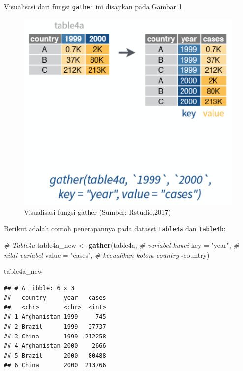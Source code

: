 \documentclass[]{book}
\newenvironment{Shaded}{\begin{snugshade}}{\end{snugshade}}
\newcommand{\KeywordTok}[1]{\textcolor[rgb]{0.13,0.29,0.53}{\textbf{#1}}}
\newcommand{\DataTypeTok}[1]{\textcolor[rgb]{0.13,0.29,0.53}{#1}}
\newcommand{\StringTok}[1]{\textcolor[rgb]{0.31,0.60,0.02}{#1}}
\newcommand{\CommentTok}[1]{\textcolor[rgb]{0.56,0.35,0.01}{\textit{#1}}}
\newcommand{\OperatorTok}[1]{\textcolor[rgb]{0.81,0.36,0.00}{\textbf{#1}}}
\newcommand{\NormalTok}[1]{#1}
\begin{document}
Visualisasi dari fungsi \texttt{gather} ini disajikan pada Gambar
\ref{fig:gather}

\begin{figure}

{\centering \includegraphics[width=5.56in]{gather} 

}

\caption{Visualisasi fungsi gather (Sumber: Rstudio,2017)}\label{fig:gather}
\end{figure}

Berikut adalah contoh penerapannya pada dataset \texttt{table4a} dan
\texttt{table4b}:

\begin{Shaded}
\begin{Highlighting}[]
\CommentTok{# Table4a}
\NormalTok{table4a_new <-}\StringTok{ }\KeywordTok{gather}\NormalTok{(table4a, }
                    \CommentTok{# variabel kunci}
                    \DataTypeTok{key =} \StringTok{"year"}\NormalTok{,}
                    \CommentTok{# nilai variabel}
                    \DataTypeTok{value =} \StringTok{"cases"}\NormalTok{,}
                    \CommentTok{# kecualikan kolom country}
                    \OperatorTok{-}\NormalTok{country)}

\NormalTok{table4a_new}
\end{Highlighting}
\end{Shaded}

\begin{verbatim}
## # A tibble: 6 x 3
##   country     year   cases
##   <chr>       <chr>  <int>
## 1 Afghanistan 1999     745
## 2 Brazil      1999   37737
## 3 China       1999  212258
## 4 Afghanistan 2000    2666
## 5 Brazil      2000   80488
## 6 China       2000  213766
\end{verbatim}
\end{document}

